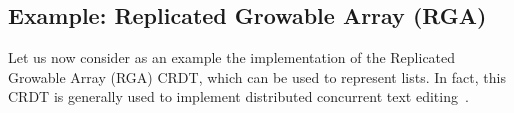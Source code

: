 









\subsection{Example: Replicated Growable Array (RGA)}
\label{sec:rga}

Let us now consider as an example the implementation of the
Replicated Growable Array (RGA) CRDT, which can be used to represent
lists.
In fact, this CRDT is generally used to implement distributed
concurrent text editing~\cite{AttiyaBGMYZ16}.


